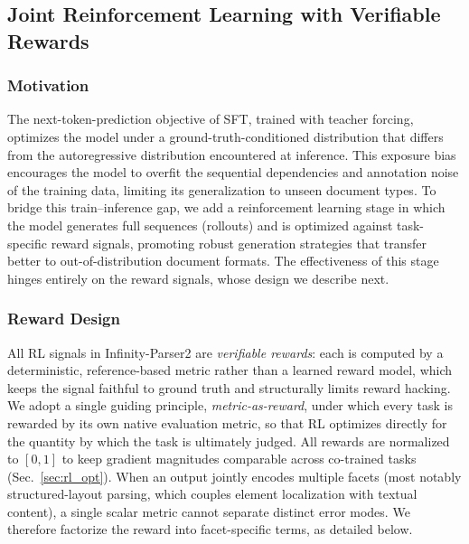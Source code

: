 \subsection{Joint Reinforcement Learning with Verifiable Rewards}
\label{sec:reinforcement_learning}

\subsubsection{Motivation}

The next-token-prediction objective of SFT, trained with teacher forcing, optimizes the model under a ground-truth-conditioned distribution that differs from the autoregressive distribution encountered at inference. This exposure bias encourages the model to overfit the sequential dependencies and annotation noise of the training data, limiting its generalization to unseen document types. To bridge this train--inference gap, we add a reinforcement learning stage in which the model generates full sequences (rollouts) and is optimized against task-specific reward signals, promoting robust generation strategies that transfer better to out-of-distribution document formats. The effectiveness of this stage hinges entirely on the reward signals, whose design we describe next.

\subsubsection{Reward Design}
\label{sec:reward_design}

All RL signals in Infinity-Parser2 are \emph{verifiable rewards}: each is computed by a deterministic, reference-based metric rather than a learned reward model, which keeps the signal faithful to ground truth and structurally limits reward hacking. We adopt a single guiding principle, \emph{metric-as-reward}, under which every task is rewarded by its own native evaluation metric, so that RL optimizes directly for the quantity by which the task is ultimately judged. All rewards are normalized to $[0,1]$ to keep gradient magnitudes comparable across co-trained tasks (Sec.~\ref{sec:rl_opt}). When an output jointly encodes multiple facets (most notably structured-layout parsing, which couples element localization with textual content), a single scalar metric cannot separate distinct error modes. We therefore factorize the reward into facet-specific terms, as detailed below.


